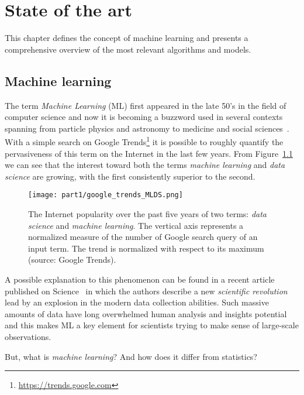 
\chapter{State of the art} \label{chap:state-of-the-art}

This chapter defines the concept of machine learning and presents a comprehensive overview of the most relevant algorithms and models.

\section{Machine learning} \label{sec:machine_learning}


The term \textit{Machine Learning} (ML) first appeared in the late 50's in the field of computer science and now it is becoming a buzzword used in several contexts spanning from particle physics and astronomy to medicine and social sciences~\cite{service2017ai}.
With a simple search on Google Trends\footnote{\url{https://trends.google.com}} it is possible to roughly quantify the pervasiveness of this term on the Internet in the last few years. From Figure~\ref{fig:google_trend_ML} we can see that the interest toward both the terms \textit{machine learning} and \textit{data science} are growing, with the first consistently superior to the second.

\begin{figure}[h!]
  \centering
    \texttt{[image: part1/google\_trends\_MLDS.png]}
  \caption{The Internet popularity over the past five years of two terms: \textit{data science} and \textit{machine learning}. The vertical axis represents a normalized measure of the number of Google search query of an input term. The trend is normalized with respect to its maximum (source: Google Trends).} \label{fig:google_trend_ML}
\end{figure}

A possible explanation to this phenomenon can be found in a recent article published on Science~\cite{appenzeller2017revolution} in which the authors describe a new \textit{scientific revolution} lead by an explosion in the modern data collection abilities.
Such massive amounts of data have long overwhelmed human analysis and insights potential and this makes ML a key element for scientists trying to make sense of large-scale observations.

But, what is \textit{machine learning}? And how does it differ from statistics?

